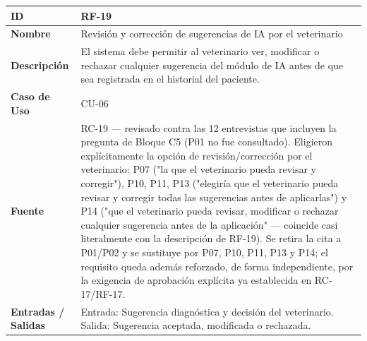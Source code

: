 \documentclass[
]{article}
\newcounter{none} %
\begin{document}
{\def\LTcaptype{none} %
\begin{longtable}[]{|
  >{\raggedright\arraybackslash}p{}|
  >{\raggedright\arraybackslash}p{}|}
\hline
\begin{minipage}[b]{\linewidth}\raggedright
\textbf{ID}
\end{minipage} & \begin{minipage}[b]{\linewidth}\raggedright
RF-19
\end{minipage} \\
\hline
\endhead
\hline
\endlastfoot
\textbf{Nombre} & \begin{minipage}[t]{\linewidth}\raggedright
Revisión y corrección de sugerencias de IA por el veterinario
\end{minipage} \\
\hline
\textbf{Descripción} & \begin{minipage}[t]{\linewidth}\raggedright
El sistema debe permitir al veterinario ver, modificar o rechazar cualquier sugerencia del módulo de IA antes de que sea registrada en el historial del paciente.
\end{minipage} \\
\hline
\textbf{Caso de Uso} & \begin{minipage}[t]{\linewidth}\raggedright
CU-06
\end{minipage} \\
\hline
\textbf{Fuente} & \begin{minipage}[t]{\linewidth}\raggedright
RC-19 — revisado contra las 12 entrevistas que incluyen la pregunta de Bloque C5 (P01 no fue consultado). Eligieron explícitamente la opción de revisión/corrección por el veterinario: P07 ("la que el veterinario pueda revisar y corregir"), P10, P11, P13 ("elegiría que el veterinario pueda revisar y corregir todas las sugerencias antes de aplicarlas") y P14 ("que el veterinario pueda revisar, modificar o rechazar cualquier sugerencia antes de la aplicación" — coincide casi literalmente con la descripción de RF-19). Se retira la cita a P01/P02 y se sustituye por P07, P10, P11, P13 y P14; el requisito queda además reforzado, de forma independiente, por la exigencia de aprobación explícita ya establecida en RC-17/RF-17.
\end{minipage} \\
\hline
\textbf{Entradas / Salidas} & \begin{minipage}[t]{\linewidth}\raggedright
Entrada: Sugerencia diagnóstica y decisión del veterinario. Salida: Sugerencia aceptada, modificada o rechazada.

\end{minipage}
\end{longtable}}
\end{document}
